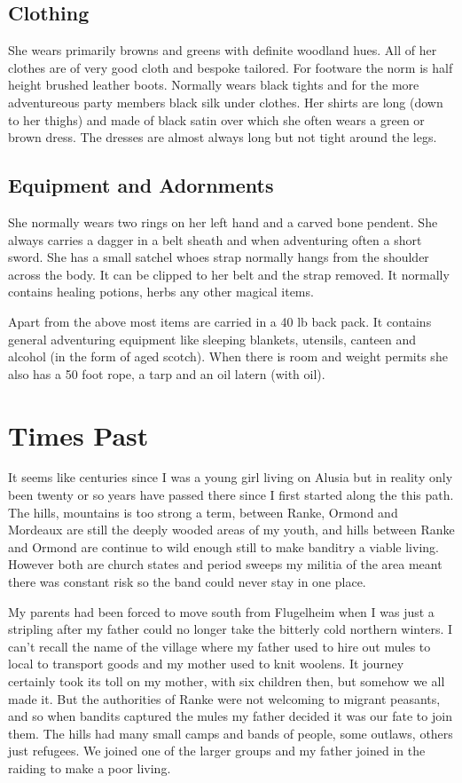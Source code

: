 \documentclass{article}
\begin{document}
\subsection{Clothing}

She wears primarily browns and greens with definite woodland hues.
All of her clothes are of very good cloth and bespoke tailored.  For
footware the norm is half height brushed leather boots.  Normally
wears black tights and for the more adventureous party members black
silk under clothes.  Her shirts are long (down to her thighs) and made
of black satin over which she often wears a green or brown dress.  The
dresses are almost always long but not tight around the legs.

\subsection{Equipment and Adornments}

She normally wears two rings on her left hand and a carved bone
pendent.  She always carries a dagger in a belt sheath and when
adventuring often a short sword.  She has a small satchel whoes strap
normally hangs from the shoulder across the body.  It can be clipped
to her belt and the strap removed.  It normally contains healing
potions, herbs any other magical items.

Apart from the above most items are carried in a 40 lb back pack.  It
contains general adventuring equipment like sleeping blankets,
utensils, canteen and alcohol (in the form of aged scotch).  When
there is room and weight permits she also has a 50 foot rope, a tarp
and an oil latern (with oil).


\section{Times Past}

It seems like centuries since I was a young girl living on Alusia
but in reality only been twenty or so years have passed there since I
first started along the this path.  The hills, mountains is too strong
a term, between Ranke, Ormond and Mordeaux are still the deeply wooded
areas of my youth, and hills between Ranke and Ormond are continue to
wild enough still to make banditry a viable living.   However both are
church states and period sweeps my militia of the area meant there was
constant risk so the band could never stay in one place.

My parents had been forced to move south from Flugelheim when I was
just a stripling after my father could no longer take the bitterly
cold northern winters.  I can't recall the name of the village where
my father used to hire out mules to local to transport goods and my
mother used to knit woolens.  It journey certainly took its toll on my
mother, with six children then, but somehow we all made it.  But the
authorities of Ranke were not welcoming to migrant peasants, and so
when bandits captured the mules my father decided it was our fate to
join them.  The hills had many small camps and bands of people, some
outlaws, others just refugees.  We joined one of the larger groups
and my father joined in the raiding to make a poor living.
\end{document}
